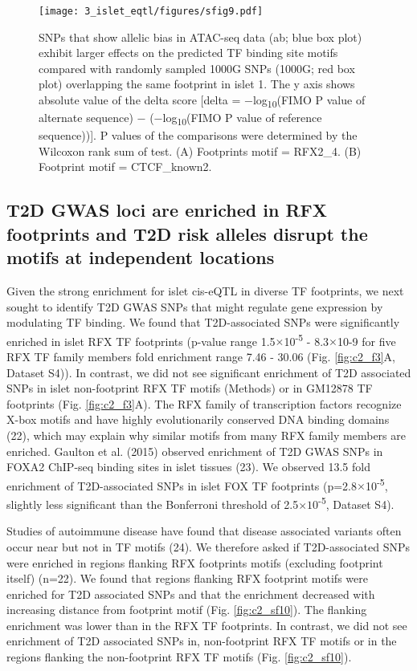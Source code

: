 \begin{figure}
    \centering
    \texttt{[image: 3\_islet\_eqtl/figures/sfig9.pdf]}
    \caption{SNPs that show allelic bias in ATAC-seq data (ab; blue box plot) exhibit larger effects on the predicted TF binding site motifs compared with randomly sampled 1000G SNPs (1000G; red box plot) overlapping the same footprint in islet 1. The y axis shows absolute value of the delta score [delta = −log\textsubscript{10}(FIMO P value of alternate sequence) − (−log\textsubscript{10}(FIMO P value of reference sequence))]. P values of the comparisons were determined by the Wilcoxon rank sum of test. (A) Footprints motif = RFX2\_4. (B) Footprint motif = CTCF\_known2.}
    \label{fig:c2_sf9}
\end{figure}

\subsection{T2D GWAS loci are enriched in RFX footprints and T2D risk alleles disrupt the motifs at independent locations}
Given the strong enrichment for islet cis-eQTL in diverse TF footprints, we next sought to identify T2D GWAS SNPs that might regulate gene expression by modulating TF binding. We found that T2D-associated SNPs were significantly enriched in islet RFX TF footprints (p-value range 1.5$\times$10\textsuperscript{-5} - 8.3$\times$10-9 for five RFX TF family members fold enrichment range 7.46 - 30.06 (Fig. \ref{fig:c2_f3}A, Dataset S4)). In contrast, we did not see significant enrichment of T2D associated SNPs in islet non-footprint RFX TF motifs (Methods) or in GM12878 TF footprints (Fig. \ref{fig:c2_f3}A). The RFX family of transcription factors recognize X-box motifs and have highly evolutionarily conserved DNA binding domains (22), which may explain why similar motifs from many RFX family members are enriched. Gaulton et al. (2015) observed enrichment of T2D GWAS SNPs in FOXA2 ChIP-seq binding sites in islet tissues (23). We observed 13.5 fold enrichment of T2D-associated SNPs in islet FOX TF footprints (p=2.8$\times$10\textsuperscript{-5}, slightly less significant than the Bonferroni threshold of 2.5$\times10$\textsuperscript{-5}, Dataset S4). 

Studies of autoimmune disease have found that disease associated variants often occur near but not in TF motifs (24). We therefore asked if T2D-associated SNPs were enriched in regions flanking RFX footprints motifs (excluding footprint itself) (n=22). We found that regions flanking RFX footprint motifs were enriched for T2D associated SNPs and that the enrichment decreased with increasing distance from footprint motif (Fig. \ref{fig:c2_sf10}). The flanking enrichment was lower than in the RFX TF footprints. In contrast, we did not see enrichment of T2D associated SNPs in, non-footprint RFX TF motifs or in the regions flanking the non-footprint RFX TF motifs (Fig. \ref{fig:c2_sf10}).

